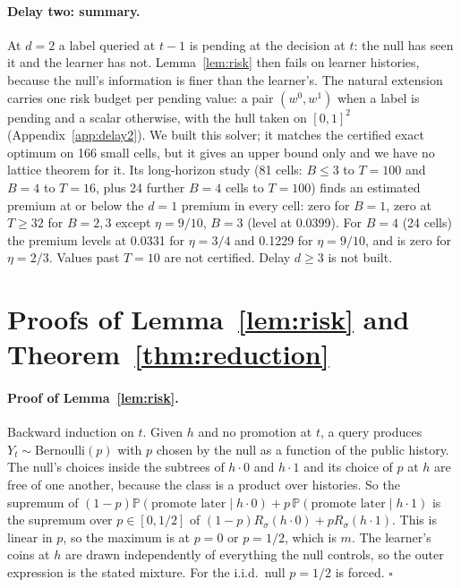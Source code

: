 \documentclass{article}
\theoremstyle{plain}
\theoremstyle{definition}
\theoremstyle{remark}
\newcommand{\PP}{\mathbb{P}}
\begin{document}
\paragraph{Delay two: summary.} At $d=2$ a label queried at $t-1$ is pending at the decision at $t$: the null has seen it and the learner has not. Lemma~\ref{lem:risk} then fails on learner histories, because the null's information is finer than the learner's. The natural extension carries one risk budget per pending value: a pair $(w^0,w^1)$ when a label is pending and a scalar otherwise, with the hull taken on $[0,1]^2$ (Appendix~\ref{app:delay2}). We built this solver; it matches the certified exact optimum on 166 small cells, but it gives an upper bound only and we have no lattice theorem for it. Its long-horizon study (81 cells: $B\le3$ to $T=100$ and $B=4$ to $T=16$, plus 24 further $B=4$ cells to $T=100$) finds an estimated premium at or below the $d=1$ premium in every cell: zero for $B=1$, zero at $T\ge32$ for $B=2,3$ except $\eta=9/10$, $B=3$ (level at 0.0399). For $B=4$ (24 cells) the premium levels at 0.0331 for $\eta=3/4$ and 0.1229 for $\eta=9/10$, and is zero for $\eta=2/3$. Values past $T=10$ are not certified. Delay $d\ge3$ is not built.
\FloatBarrier

\section{Proofs of Lemma~\ref{lem:risk} and Theorem~\ref{thm:reduction}}
\label{app:proofs}

\paragraph{Proof of Lemma~\ref{lem:risk}.} Backward induction on $t$. Given $h$ and no promotion at $t$, a query produces $Y_t\sim\mathrm{Bernoulli}(p)$ with $p$ chosen by the null as a function of the public history. The null's choices inside the subtrees of $h\cdot0$ and $h\cdot1$ and its choice of $p$ at $h$ are free of one another, because the class is a product over histories. So the supremum of $(1-p)\PP(\text{promote later}\mid h\cdot0)+p\,\PP(\text{promote later}\mid h\cdot1)$ is the supremum over $p\in[0,1/2]$ of $(1-p)R_\sigma(h\cdot0)+pR_\sigma(h\cdot1)$. This is linear in $p$, so the maximum is at $p=0$ or $p=1/2$, which is $m$. The learner's coins at $h$ are drawn independently of everything the null controls, so the outer expression is the stated mixture. For the i.i.d.\ null $p=1/2$ is forced. \hfill$\square$
\end{document}
